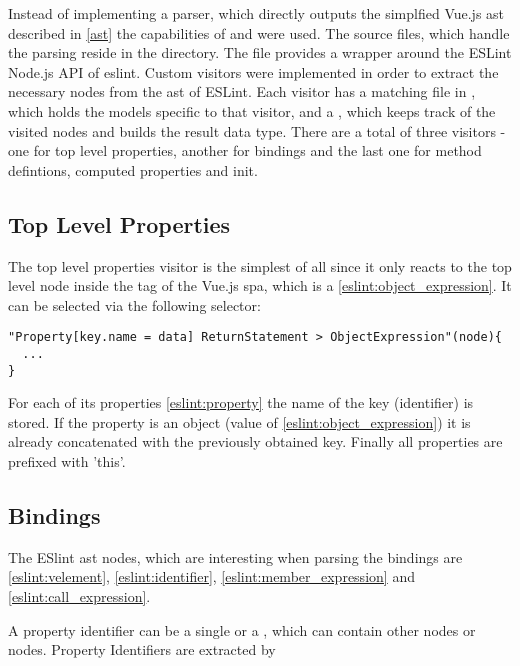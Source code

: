 Instead of implementing a parser, which directly outputs the simplfied Vue.js \gls{ast} described in \ref{ast} the capabilities of \textcite{eslint}  %
and \parencite{eslint_vue_parser} were used. 
The source files, which handle the parsing reside in the  directory.
The file  provides a wrapper around the ESLint Node.js API of eslint. Custom visitors were implemented in order to extract the necessary nodes from the \gls{ast} of ESLint. Each visitor has a matching file in , which holds the models specific to that visitor, and a , which keeps track of the visited nodes and builds the result data type. There are a total of three visitors - one for top level properties, another for bindings and the last one for method defintions, computed properties and init.

\subsection{Top Level Properties}
The top level properties visitor is the simplest of all since it only reacts to the top level  node inside the  tag of the Vue.js \gls{spa}, which is a  \ref{eslint:object_expression}. It can be selected via the following selector:
\begin{lstlisting}
"Property[key.name = data] ReturnStatement > ObjectExpression"(node){
  ...
}
\end{lstlisting}
For each of its properties \ref{eslint:property} the name of the key (identifier) is stored. If the property is an object (value of  \ref{eslint:object_expression}) it is already concatenated with the previously obtained key. Finally all properties are prefixed with 'this'.  

\subsection{Bindings}
The ESlint \gls{ast} nodes, which are interesting when parsing the bindings are  \ref{eslint:velement}, 
 \ref{eslint:identifier},  \ref{eslint:member_expression} and  \ref{eslint:call_expression}. 

A property identifier can be a single  or a , which can contain other  nodes or  nodes. Property Identifiers are extracted by 

